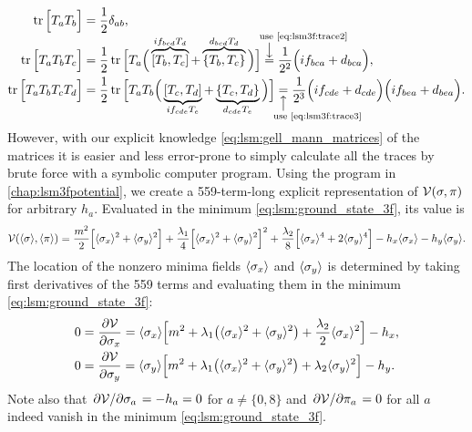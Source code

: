 \begin{subequations}
\begin{align}
	\trace\Big[T_a T_b\Big] &= \frac{1}{2} \delta_{ab} \label{eq:lsm3f:trace2}, \\
	\trace\Big[T_a T_b T_c\Big] &= \frac{1}{2} \trace\Big[T_a\Big(\overbrace{[T_b,T_c]}^{\smash{i f_{bcd} T_d}}+\overbrace{\{T_b,T_c\}}^{\smash{d_{bcd} T_d}}\Big)\Big]
	                             \equalexplabove{\smash[t]{use \eqref{eq:lsm3f:trace2}}} \frac{1}{2^2} \Big( i f_{bca} + d_{bca} \Big), \label{eq:lsm3f:trace3} \\
	\trace\Big[T_a T_b T_c T_d\Big] &= \frac{1}{2} \trace\Big[T_a T_b \Big( \underbrace{[T_c,T_d]}_{\smash{i f_{cde} T_e}} + \underbrace{\{T_c,T_d\}}_{\smash{d_{cde} T_e}} \Big) \Big]
	                                 \equalexplbelow{\smash[b]{use \eqref{eq:lsm3f:trace3}}} \frac{1}{2^3} \Big( i f_{cde} + d_{cde} \Big) \Big( i f_{bea} + d_{bea} \Big). \label{eq:lsm3f:trace4}
\end{align}
\end{subequations}
However, with our explicit knowledge \eqref{eq:lsm:gell_mann_matrices} of the matrices
it is easier and less error-prone to simply calculate all the traces by brute force with a symbolic computer program.
Using the program in \cref{chap:lsm3fpotential},
we create a 559-term-long explicit representation of $\mathcal{V}(\sigma,\pi)$ for arbitrary $h_a$.
Evaluated in the minimum \eqref{eq:lsm:ground_state_3f}, its value is
\begin{equation}
	\mathcal{V}(\langle \sigma \rangle,\langle \pi \rangle) = \frac{m^2}{2} \Big[ \langle \sigma_x \rangle^2 + \langle \sigma_y \rangle^2 \Big] + \frac{\lambda_1}{4} \Big[ \langle \sigma_x \rangle^2 + \langle \sigma_y \rangle^2 \Big]^2 + \frac{\lambda_2}{8} \Big[ \langle \sigma_x \rangle^4 + 2 \langle \sigma_y \rangle^4 \Big] - h_x \langle \sigma_x \rangle - h_y \langle \sigma_y \rangle.
\label{eq:lsm:potential_tree_3f}
\end{equation}
The location of the nonzero minima fields $\langle \sigma_x \rangle$ and $\langle \sigma_y \rangle$ is determined
by taking first derivatives of the 559 terms and evaluating them in the minimum \eqref{eq:lsm:ground_state_3f}:
\begin{subequations}
\begin{align}
	0 &= \pdv{\mathcal{V}}{\sigma_x} = \langle \sigma_x \rangle \Big[ m^2 + \lambda_1 \big( \langle \sigma_x \rangle^2 + \langle \sigma_y \rangle^2 \big) + \frac{\lambda_2}{2} \langle \sigma_x \rangle^2 \Big] - h_x, \\
	0 &= \pdv{\mathcal{V}}{\sigma_y} = \langle \sigma_y \rangle \Big[ m^2 + \lambda_1 \big( \langle \sigma_x \rangle^2 + \langle \sigma_y \rangle^2 \big) + \lambda_2 \langle \sigma_y \rangle^2 \Big] - h_y.
\end{align}
\label{eq:lsm3f:symmetry_breakers}%
\end{subequations}
Note also that $\pdv{\mathcal{V}}/{\sigma_a} = -h_a = 0$ for $a \neq \{0,8\}$ and $\pdv{\mathcal{V}}/{\pi_a}=0$ for all $a$ indeed vanish in the minimum \eqref{eq:lsm:ground_state_3f}.

